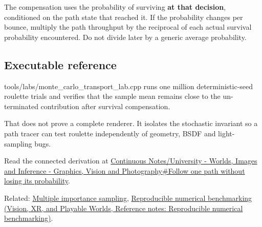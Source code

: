 \hypertarget{appendix-7277c62d4599-conditional-probability-matters}{}

The compensation uses the probability of surviving \textbf{at that decision}, conditioned on the path state that reached it. If the probability changes per bounce, multiply the path throughput by the reciprocal of each actual survival probability encountered. Do not divide later by a generic average probability.

\subsection{Executable reference}\label{appendix-7277c62d4599-executable-reference}

\hypertarget{appendix-7277c62d4599-executable-reference}{}

tools/labs/monte\_carlo\_transport\_lab.cpp runs one million deterministic-seed roulette trials and verifies that the sample mean remains close to the un-terminated contribution after survival compensation.

That does not prove a complete renderer. It isolates the stochastic invariant so a path tracer can test roulette independently of geometry, BSDF and light-sampling bugs.

Read the connected derivation at \hyperref[03-visual-computing-i-ch007-follow-one-path-without-losing-its-probability]{Continuous Notes/University - Worlds, Images and Inference - Graphics, Vision and Photography\#Follow one path without losing its probability}.

Related: \hyperref[appendix-ca8898faf1a6]{Multiple importance sampling}, \href{../07-Vision-XR-and-Playable-Worlds/main.pdf\#nameddest=appendix-b9db93e28371}{Reproducible numerical benchmarking (Vision, XR, and Playable Worlds, Reference notes: Reproducible numerical benchmarking)}.
